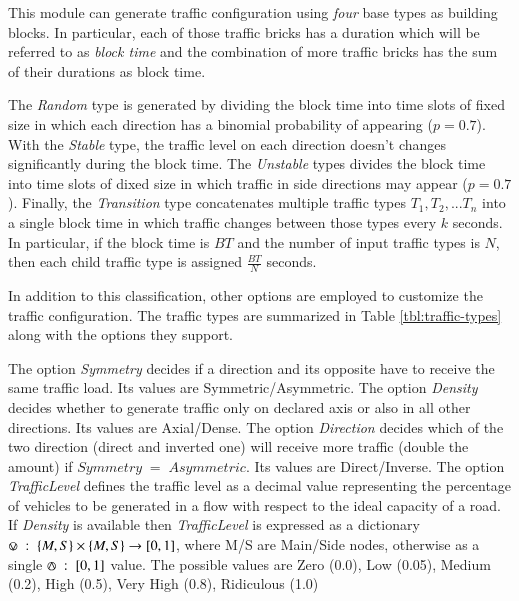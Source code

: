 This module can generate traffic configuration using \textit{four} base types as building blocks.
In particular, each of those traffic bricks has a duration which will be referred to as \textit{block time} and the combination of more traffic bricks has the sum of their durations as block time.

The \textit{Random} type is generated by dividing the block time into time slots of fixed size in which each direction has a binomial probability of appearing ($p=0.7$).
With the \textit{Stable} type, the traffic level on each direction doesn't changes significantly during the block time.
The \textit{Unstable} types divides the block time into time slots of dixed size in which traffic in side directions may appear ($p=0.7$).
Finally, the \textit{Transition} type concatenates multiple traffic types $T_1, T_2, ... T_n$ into a single block time in which traffic changes between those types every $k$ seconds. In particular, if the block time is $BT$ and the number of input traffic types is $N$, then each child traffic type is assigned $\frac {BT} {N}$ seconds.

In addition to this classification, other options are employed to customize the traffic configuration.
The traffic types are summarized in Table \ref{tbl:traffic-types} along with the options they support.

The option \textit{Symmetry} decides if a direction and its opposite have to receive the same traffic load. Its values are Symmetric/Asymmetric.
The option \textit{Density} decides whether to generate traffic only on declared axis or also in all other directions. Its values are Axial/Dense.
The option \textit{Direction} decides which of the two direction (direct and inverted one) will receive more traffic (double the amount) if $Symmetry \; = \; Asymmetric$. Its values are Direct/Inverse.
The option \textit{TrafficLevel} defines the traffic level as a decimal value representing the percentage of vehicles to be generated in a flow with respect to the ideal capacity of a road.
If \textit{Density} is available then \textit{TrafficLevel} is expressed as a dictionary $\circledvee \; : \; \{M, S\} \times \{M, S\} \rightarrow [0, 1]$, where M/S are Main/Side nodes, otherwise as a single $\circledwedge \; : \; [0,1]$ value.
The possible values are Zero (0.0), Low (0.05), Medium (0.2), High (0.5), Very High (0.8), Ridiculous (1.0)


